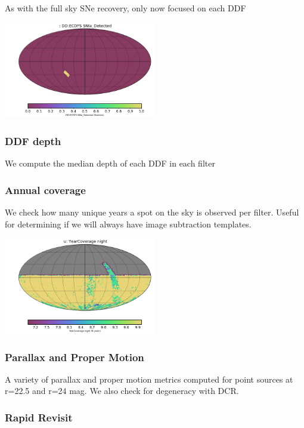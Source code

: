 {As with the full sky SNe recovery, only now focused on each DDF

\includegraphics[width=0.5\textwidth]{metric_summary/sci_baseline_v1.4_10yrs/thumb._DD_ECDFS_SNIa_Detected_USER_SkyMap.png}

\subsubsection{DDF depth}

We compute the median depth of each DDF in each filter


\subsubsection{Annual coverage}

We check how many unique years a spot on the sky is observed per filter. Useful for determining if we will always have image subtraction templates.

\includegraphics[width=0.5\textwidth]{metric_summary/sci_baseline_v1.4_10yrs/thumb._YearCoverage_night_u_HEAL_SkyMap.png}

\subsubsection{Parallax and Proper Motion}

A variety of parallax and proper motion metrics computed for point sources at r=22.5 and r=24 mag. We also check for degeneracy with DCR.

\subsubsection{Rapid Revisit}

}
